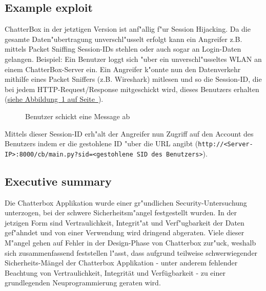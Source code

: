 \documentclass[12pt,a4paper,titlepage,oneside]{scrartcl}
\begin{document}
\subsection{Example exploit}
ChatterBox in der jetztigen Version ist anf"allig f"ur Session Hijacking. Da die gesamte Daten"ubertragung unverschl"usselt erfolgt kann ein Angreifer z.B. mittels Packet Sniffing Session-IDs stehlen oder auch sogar an Login-Daten gelangen.
\newline
\newline
Beispiel:
\newline
Ein Benutzer loggt sich "uber ein unverschl"usseltes WLAN an einem ChatterBox-Server ein. Ein Angreifer k"onnte nun den Datenverkehr mithilfe eines Packet Sniffers (z.B. Wireshark) mitlesen und so die Session-ID, die bei jedem HTTP-Request/Response mitgeschickt wird, dieses Benutzers erhalten (\hyperref[fig:message]{siehe Abbildung~\ref*{fig:message} auf Seite~\pageref*{fig:message}}).
\begin{figure}[h!]
  \centering
  \caption{Benutzer schickt eine Message ab}
  \label{fig:message}
\end{figure}
\newline
\newline
Mittels dieser Session-ID erh"alt der Angreifer nun Zugriff auf den Account des Benutzers indem er die gestohlene ID "uber die URL angibt (\lstinline{http://<Server-IP>:8000/cb/main.py?sid=<gestohlene SID des Benutzers>}).

\subsection{Executive summary}
Die Chatterbox Applikation wurde einer gr"undlichen Security-Untersuchung unterzogen, bei der schwere Sicherheitsm"angel festgestellt wurden. In der jetzigen Form sind Vertraulichkeit, Integrit"at und Verf"ugbarkeit der Daten gef"ahndet und von einer Verwendung wird dringend abgeraten. Viele dieser M"angel gehen auf Fehler in der Design-Phase von Chatterbox zur"uck, weshalb sich zusammenfassend feststellen l"asst, dass aufgrund teilweise schwerwiegender Sicherheits-Mängel der Chatterbox Applikation - unter anderem fehlender Beachtung von Vertraulichkeit, Integrität und Verfügbarkeit - zu einer grundlegenden Neuprogrammierung geraten wird.
\end{document}
